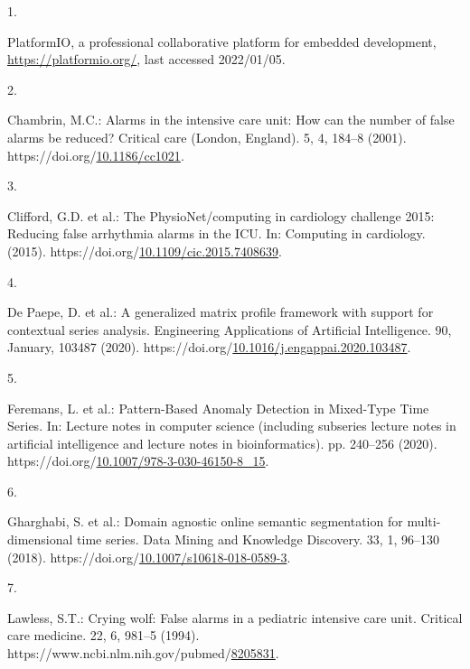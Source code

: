 \documentclass[runningheads]{llncs}
\newlength{\cslhangindent}
\newlength{\csllabelwidth}
\newenvironment{CSLReferences}[2] %
 {%
  \setlength{\parindent}{0pt}
  \ifodd #1 \everypar{\setlength{\hangindent}{\cslhangindent}}\ignorespaces\fi
  \ifnum #2 > 0
  \setlength{\parskip}{#2\baselineskip}
  \fi
 }%
 {}
\newcommand{\CSLLeftMargin}[1]{\parbox[t]{\csllabelwidth}{#1}}
\newcommand{\CSLRightInline}[1]{\parbox[t]{\linewidth - \csllabelwidth}{#1}\break}
\begin{document}
\hypertarget{refs}{}
\begin{CSLReferences}{0}{0}
\leavevmode{}%
\CSLLeftMargin{1. }
\CSLRightInline{PlatformIO, a professional collaborative platform for embedded development, \url{https://platformio.org/}, last accessed 2022/01/05.}

\leavevmode{}%
\CSLLeftMargin{2. }
\CSLRightInline{Chambrin, M.C.: Alarms in the intensive care unit: How can the number of false alarms be reduced? Critical care (London, England). 5, 4, 184--8 (2001). https://doi.org/\href{https://doi.org/10.1186/cc1021}{10.1186/cc1021}.}

\leavevmode{}%
\CSLLeftMargin{3. }
\CSLRightInline{Clifford, G.D. et al.: The PhysioNet/computing in cardiology challenge 2015: Reducing false arrhythmia alarms in the ICU. In: Computing in cardiology. (2015). https://doi.org/\href{https://doi.org/10.1109/cic.2015.7408639}{10.1109/cic.2015.7408639}.}

\leavevmode{}%
\CSLLeftMargin{4. }
\CSLRightInline{De Paepe, D. et al.: {A generalized matrix profile framework with support for contextual series analysis}. Engineering Applications of Artificial Intelligence. 90, January, 103487 (2020). https://doi.org/\href{https://doi.org/10.1016/j.engappai.2020.103487}{10.1016/j.engappai.2020.103487}.}

\leavevmode{}%
\CSLLeftMargin{5. }
\CSLRightInline{Feremans, L. et al.: {Pattern-Based Anomaly Detection in Mixed-Type Time Series}. In: Lecture notes in computer science (including subseries lecture notes in artificial intelligence and lecture notes in bioinformatics). pp. 240--256 (2020). https://doi.org/\href{https://doi.org/10.1007/978-3-030-46150-8_15}{10.1007/978-3-030-46150-8\_15}.}

\leavevmode{}%
\CSLLeftMargin{6. }
\CSLRightInline{Gharghabi, S. et al.: Domain agnostic online semantic segmentation for multi-dimensional time series. Data Mining and Knowledge Discovery. 33, 1, 96--130 (2018). https://doi.org/\href{https://doi.org/10.1007/s10618-018-0589-3}{10.1007/s10618-018-0589-3}.}

\leavevmode{}%
\CSLLeftMargin{7. }
\CSLRightInline{Lawless, S.T.: Crying wolf: False alarms in a pediatric intensive care unit. Critical care medicine. 22, 6, 981--5 (1994). https://www.ncbi.nlm.nih.gov/pubmed/\href{https://www.ncbi.nlm.nih.gov/pubmed/8205831}{8205831}.}


\end{CSLReferences}
\end{document}
